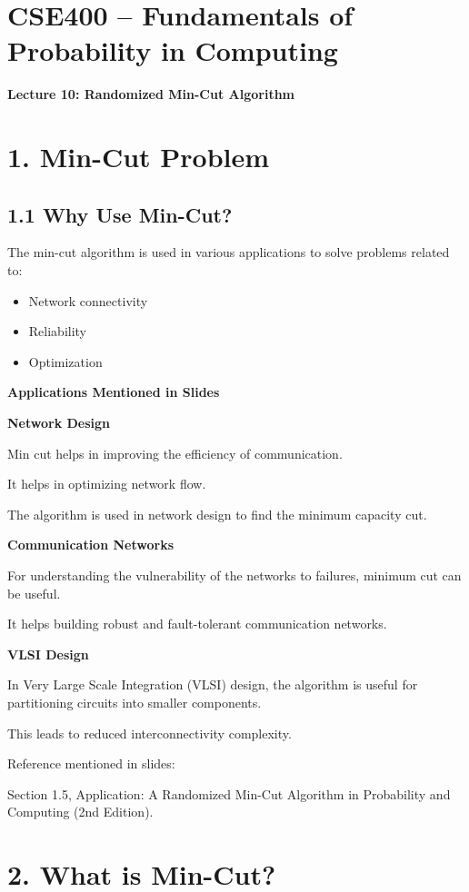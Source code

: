 \documentclass[11pt]{article}
\begin{document}
\section*{CSE400 – Fundamentals of Probability in Computing}
\textbf{Lecture 10: Randomized Min-Cut Algorithm}

\section*{1. Min-Cut Problem}

\subsection*{1.1 Why Use Min-Cut?}

The min-cut algorithm is used in various applications to solve problems related to:

\begin{itemize}
\item Network connectivity
\item Reliability
\item Optimization
\end{itemize}

\textbf{Applications Mentioned in Slides}

\textbf{Network Design}

Min cut helps in improving the efficiency of communication.

It helps in optimizing network flow.

The algorithm is used in network design to find the minimum capacity cut.

\textbf{Communication Networks}

For understanding the vulnerability of the networks to failures, minimum cut can be useful.

It helps building robust and fault-tolerant communication networks.

\textbf{VLSI Design}

In Very Large Scale Integration (VLSI) design, the algorithm is useful for partitioning circuits into smaller components.

This leads to reduced interconnectivity complexity.

Reference mentioned in slides:

Section 1.5, Application: A Randomized Min-Cut Algorithm in Probability and Computing (2nd Edition).

\section*{2. What is Min-Cut?}
\end{document}
